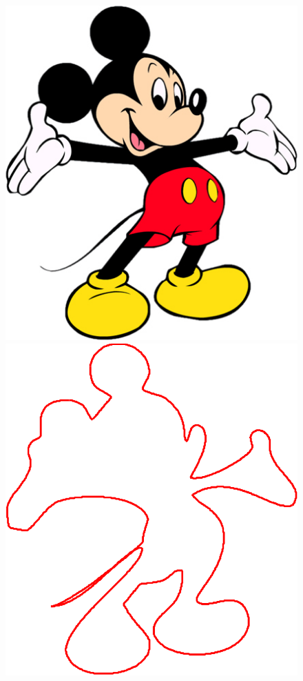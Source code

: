 \documentclass[10pt]{article}
\begin{document}
\begin{figure}
\begin{minipage}[t]{.24\textwidth}
\end{minipage}\hfill
\begin{minipage}[t]{.24\textwidth}
\centering
\vspace{0pt}
    \includegraphics[scale=0.3]{mickey2.jpg}
\end{minipage}
\begin{minipage}[t]{.24\textwidth}
\centering
\vspace{0pt}
    \includegraphics[scale=0.3]{mickey2-crop.pdf}

\end{minipage}
\end{figure}
\end{document}
